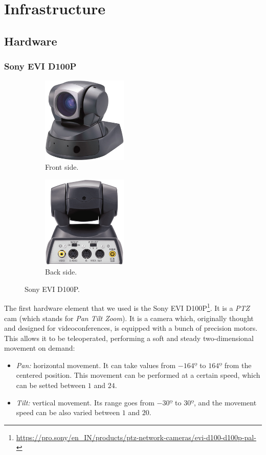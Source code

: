 \chapter{Infrastructure}

\section{Hardware}
	\subsection{Sony EVI D100P}
		\begin{figure}[h]
			\centering
			\begin{subfigure}[h]{0.4\linewidth}
				\centering
				\includegraphics[width=1.6in]{images/ptz_front}
				\caption{Front side.}
			\end{subfigure}
			\qquad
			\begin{subfigure}[h]{0.4\linewidth}
				\centering
				\includegraphics[width=1.6in]{images/ptz_back}
				\caption{Back side.}
			\end{subfigure}
			\caption{Sony EVI D100P.}
			\label{fig:3_evi}
		\end{figure} 
		
		The first hardware element that we used is the Sony EVI D100P\footnote{\url{https://pro.sony/en_IN/products/ptz-network-cameras/evi-d100-d100p-pal-}}. It is a \emph{PTZ} cam (which stands for \emph{Pan Tilt Zoom}). It is a camera which, originally thought and designed for videoconferences, is equipped with a bunch of precision motors. This allows it to be teleoperated, performing a soft and steady two-dimensional movement on demand:
		\begin{itemize}
			\item \emph{Pan:} horizontal movement. It can take values from $-164º$ to $164º$ from the centered position. This movement can be performed at a certain speed, which can be setted between $1$ and $24$.

			\item \emph{Tilt:} vertical movement. Its range goes from $-30º$ to $30º$, and the movement speed can be also varied between $1$ and $20$.
		\end{itemize}

